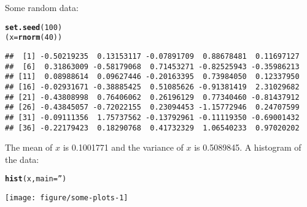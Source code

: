 \documentclass{article}\usepackage[]{graphicx}\usepackage[]{color}
\makeatletter
\newcommand{\hlnum}[1]{\textcolor[rgb]{0.686,0.059,0.569}{#1}}%
\newcommand{\hlstr}[1]{\textcolor[rgb]{0.192,0.494,0.8}{#1}}%
\newcommand{\hlstd}[1]{\textcolor[rgb]{0.345,0.345,0.345}{#1}}%
\newcommand{\hlkwb}[1]{\textcolor[rgb]{0.69,0.353,0.396}{#1}}%
\newcommand{\hlkwc}[1]{\textcolor[rgb]{0.333,0.667,0.333}{#1}}%
\newcommand{\hlkwd}[1]{\textcolor[rgb]{0.737,0.353,0.396}{\textbf{#1}}}%
\newenvironment{kframe}{%
 \def\at@end@of@kframe{}%
 \ifinner\ifhmode%
  \def\at@end@of@kframe{\end{minipage}}%
  \begin{minipage}{\columnwidth}%
 \fi\fi%
 \def\FrameCommand##1{\hskip\@totalleftmargin \hskip-\fboxsep
 \colorbox{shadecolor}{##1}\hskip-\fboxsep
     \hskip-\linewidth \hskip-\@totalleftmargin \hskip\columnwidth}%
 \MakeFramed {\advance\hsize-\width
   \@totalleftmargin\z@ \linewidth\hsize
   \@setminipage}}%
 {\par\unskip\endMakeFramed%
 \at@end@of@kframe}
\newenvironment{knitrout}{}{} %
\makeatother
\begin{document}
Some random data:

\begin{knitrout}
\color{fgcolor}\begin{kframe}
\begin{alltt}
\hlkwd{set.seed}\hlstd{(}\hlnum{100}\hlstd{)}
\hlstd{(x}\hlkwb{=}\hlkwd{rnorm}\hlstd{(}\hlnum{40}\hlstd{))}
\end{alltt}
\begin{verbatim}
##  [1] -0.50219235  0.13153117 -0.07891709  0.88678481  0.11697127
##  [6]  0.31863009 -0.58179068  0.71453271 -0.82525943 -0.35986213
## [11]  0.08988614  0.09627446 -0.20163395  0.73984050  0.12337950
## [16] -0.02931671 -0.38885425  0.51085626 -0.91381419  2.31029682
## [21] -0.43808998  0.76406062  0.26196129  0.77340460 -0.81437912
## [26] -0.43845057 -0.72022155  0.23094453 -1.15772946  0.24707599
## [31] -0.09111356  1.75737562 -0.13792961 -0.11119350 -0.69001432
## [36] -0.22179423  0.18290768  0.41732329  1.06540233  0.97020202
\end{verbatim}
\end{kframe}
\end{knitrout}

The mean of $x$ is 0.1001771 and the variance of $x$ is 0.5089845. A
histogram of the data:

\begin{knitrout}
\color{fgcolor}\begin{kframe}
\begin{alltt}
\hlkwd{hist}\hlstd{(x,}\hlkwc{main}\hlstd{=}\hlstr{''}\hlstd{)}
\end{alltt}
\end{kframe}
\texttt{[image: figure/some-plots-1]} 

\end{knitrout}
\end{document}
